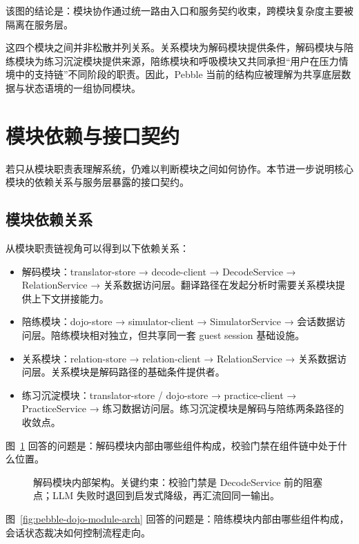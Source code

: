 该图的结论是：模块协作通过统一路由入口和服务契约收束，跨模块复杂度主要被隔离在服务层。

这四个模块之间并非松散并列关系。关系模块为解码模块提供条件，解码模块与陪练模块为练习沉淀模块提供来源，陪练模块和呼吸模块又共同承担“用户在压力情境中的支持链”不同阶段的职责。因此，Pebble 当前的结构应被理解为共享底层数据与状态语境的一组协同模块。

\section{模块依赖与接口契约}


若只从模块职责表理解系统，仍难以判断模块之间如何协作。本节进一步说明核心模块的依赖关系与服务层暴露的接口契约。

\subsection{模块依赖关系}

从模块职责链视角可以得到以下依赖关系：

\begin{itemize}
  \item 解码模块：translator-store → decode-client → DecodeService → RelationService → 关系数据访问层。翻译路径在发起分析时需要关系模块提供上下文拼接能力。
  \item 陪练模块：dojo-store → simulator-client → SimulatorService → 会话数据访问层。陪练模块相对独立，但共享同一套 guest session 基础设施。
  \item 关系模块：relation-store → relation-client → RelationService → 关系数据访问层。关系模块是解码路径的基础条件提供者。
  \item 练习沉淀模块：translator-store / dojo-store → practice-client → PracticeService → 练习数据访问层。练习沉淀模块是解码与陪练两条路径的收敛点。
\end{itemize}

图~\ref{fig:pebble-decode-module-arch} 回答的问题是：解码模块内部由哪些组件构成，校验门禁在组件链中处于什么位置。

\begin{figure}[H]
  \centering
  
  \caption{解码模块内部架构。关键约束：校验门禁是 DecodeService 前的阻塞点；LLM 失败时退回到启发式降级，再汇流回同一输出。}
  \label{fig:pebble-decode-module-arch}
\end{figure}

图~\ref{fig:pebble-dojo-module-arch} 回答的问题是：陪练模块内部由哪些组件构成，会话状态裁决如何控制流程走向。

